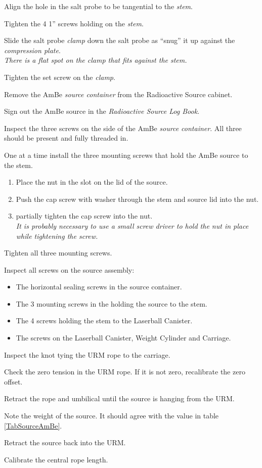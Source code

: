 \begin{enumerate}
\checkitem Align the  hole in the salt probe to be tangential to
  the {\em stem}.

\checkitem Tighten the 4 1'' screws holding on the {\em stem}.

\checkitem Slide the salt probe {\em clamp} down the salt probe as ``snug''
  it up against the {\em compression plate}. \\
  {\em There is a flat spot on the clamp that fits against the stem.}

\checkitem Tighten the set screw on the {\em clamp}.

\checkitem Remove the AmBe {\em source container} from the Radioactive Source
  cabinet.

\checkitem Sign out the AmBe source in the {\em Radioactive Source Log Book}.

\checkitem  Inspect the three screws on the side of the
  AmBe {\em source container}.  All three should be present and
  fully threaded in.

\checkitem One at a time install the three mounting screws that hold the
  AmBe source to the stem.
  \begin{enumerate}
  \item Place the nut in the slot on the lid of the source.
  \item Push the cap screw with washer through the stem and source lid
    into the nut.
  \item partially tighten the cap screw into the nut.\\
    {\em It is probably necessary to use a small screw driver to hold
      the nut in place while tightening the screw.}
  \end{enumerate}
  
\checkitem Tighten all three mounting screws.

\checkitem Inspect all screws on the source assembly:
  \begin{itemize}
  \item The horizontal sealing screws in the source container.
  \item The 3 mounting screws in the holding the source to the stem.
  \item The 4 screws holding the stem to the Laserball Canister.
  \item The screws on the Laserball Canister, Weight Cylinder and
     Carriage.
  \end{itemize}

\checkitem Inspect the knot tying the URM rope to the carriage.

\checkitem Check the zero tension in the URM rope.  If it is not zero,
  recalibrate the zero offset.

\checkitem Retract the rope and umbilical until the source is hanging
  from the URM.
 
\checkitem Note the weight of the source.  It should agree with the
  value in table \ref{TabSourceAmBe}.

\checkitem Retract the source back into the URM.

\checkitem Calibrate the central rope length.




\end{enumerate}
